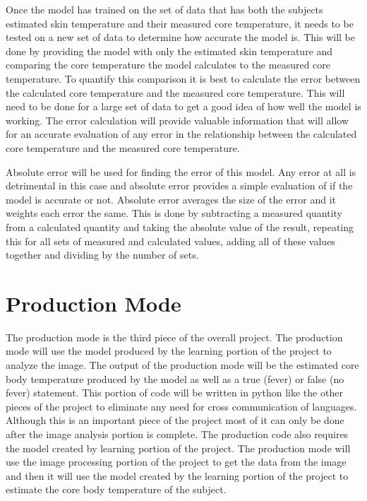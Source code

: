 \documentclass[onecolumn, draftclsnofoot,10pt, compsoc]{IEEEtran}
\begin{document}
Once the model has trained on the set of data that has both the subjects estimated skin temperature and their measured core temperature, it needs to be tested on a new set of data to determine how accurate the model is. This will be done by providing the model with only the estimated skin temperature and comparing the core temperature the model calculates to the measured core temperature. To quantify this comparison it is best to calculate the error between the calculated core temperature and the measured core temperature. This will need to be done for a large set of data to get a good idea of how well the model is working. The error calculation will provide valuable information that will allow for an accurate evaluation of any error in the relationship between the calculated core temperature and the measured core temperature. 

Absolute error will be used for finding the error of this model. Any error at all is detrimental in this case and absolute error provides a simple evaluation of if the model is accurate or not. Absolute error averages the size of the error and it weights each error the same. This is done by subtracting a measured quantity from a calculated quantity and taking the absolute value of the result, repeating this for all sets of measured and calculated values, adding all of these values together and dividing by the number of sets. \cite{BiancaTech}

\section{Production Mode}
The production mode is the third piece of the overall project. The production mode will use the model produced by the learning portion of the project to analyze the image. The output of the production mode will be the estimated core body temperature produced by the model as well as a true (fever) or false (no fever) statement. This portion of code will be written in python like the other pieces of the project to eliminate any need for cross communication of languages. Although this is an important piece of the project most of it can only be done after the image analysis portion is complete. The production code also requires the model created by learning portion of the project. The production mode will use the image processing portion of the project to get the data from the image and then it will use the model created by the learning portion of the project to estimate the core body temperature of the subject. 
\end{document}
